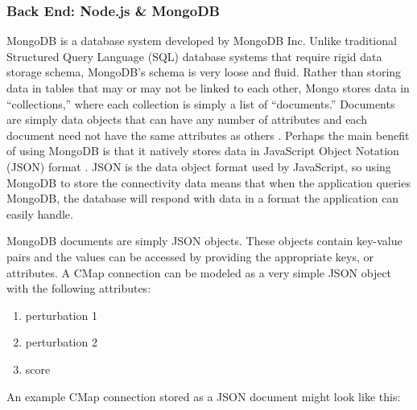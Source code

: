 \documentclass[12pt]{article}
\begin{document}


\subsubsection{Back End: Node.js \& MongoDB}

MongoDB is a database system developed by MongoDB Inc. Unlike traditional Structured Query Language (SQL) database systems that require rigid data storage schema, MongoDB's schema is very loose and fluid. Rather than storing data in tables that may or may not be linked to each other, Mongo stores data in ``collections,'' where each collection is simply a list of ``documents.'' Documents are simply data objects that can have any number of attributes and each document need not have the same attributes as others \cite{mongodb}. Perhaps the main benefit of using MongoDB is that it natively stores data in JavaScript Object Notation (JSON) format \cite{json}. JSON is the data object format used by JavaScript, so using MongoDB to store the connectivity data means that when the application queries MongoDB, the database will respond with data in a format the application can easily handle.

MongoDB documents are simply JSON objects. These objects contain key-value pairs and the values can be accessed by providing the appropriate keys, or attributes. A CMap connection can be modeled as a very simple JSON object with the following attributes:

\begin{enumerate}
\item perturbation 1
\item perturbation 2
\item score
\end{enumerate}

An example CMap connection stored as a JSON document might look like this:
\end{document}
